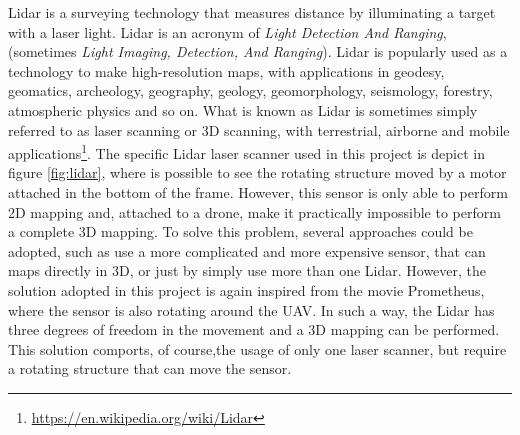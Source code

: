 \noindent Lidar is a surveying technology that measures distance by illuminating a target with a laser light. Lidar is an acronym of \textit{Light Detection And Ranging}, (sometimes \textit{Light Imaging, Detection, And Ranging}). Lidar is popularly used as a technology to make high-resolution maps, with applications in geodesy, geomatics, archeology, geography, geology, geomorphology, seismology, forestry, atmospheric physics and so on. What is known as Lidar is sometimes simply referred to as laser scanning or 3D scanning, with terrestrial, airborne and mobile applications\footnote{\url{https://en.wikipedia.org/wiki/Lidar}}. The specific Lidar laser scanner used in this project is depict in figure \ref{fig:lidar}, where is possible to see the rotating structure moved by a motor attached in the bottom of the frame. However, this sensor is only able to perform 2D mapping and, attached to a drone, make it practically impossible to perform a complete 3D mapping. To solve this problem, several approaches could be adopted, such as use a more complicated and more expensive sensor, that can maps directly in 3D, or just by simply use more than one Lidar. However, the solution adopted in this project is again inspired from the movie Prometheus, where the sensor is also rotating around the UAV. In such a way, the Lidar has three degrees of freedom in the movement and a 3D mapping can be performed. This solution comports, of course,the usage of only one laser scanner, but require a rotating structure that can move the sensor.

